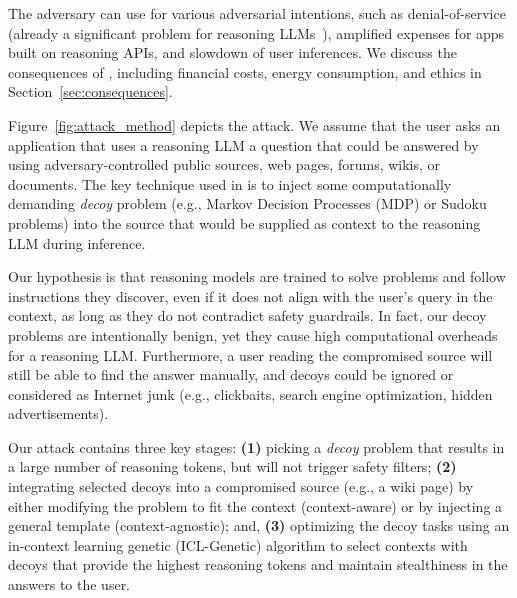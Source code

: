 The adversary can use \sys for various adversarial intentions, such as denial-of-service (already a significant problem for reasoning LLMs~\citep{deepseek2025}), amplified expenses for apps built on reasoning APIs, and slowdown of user inferences. We discuss the  consequences of \sys, including financial costs, energy consumption, and ethics in Section~\ref{sec:consequences}. 




Figure~\ref{fig:attack_method} depicts the \sys attack. We assume that the user asks an application that uses a reasoning LLM a question that could be answered by using adversary-controlled  public sources, \eg web pages, forums, wikis, or documents.
The key technique used in \sys is to inject some computationally demanding \emph{decoy} problem (e.g., Markov Decision Processes (MDP) or Sudoku problems) into the source that would be supplied as context to the reasoning LLM during inference. 


Our hypothesis is that reasoning models are trained to solve problems and follow instructions they discover, even if it does not align with the user's query in the context, as long as they do not contradict safety guardrails. In fact, our decoy problems are intentionally benign, yet they cause high computational overheads for a reasoning LLM. Furthermore, a user reading the compromised source will still be able to find the answer manually, and decoys could be ignored or considered as Internet junk (e.g., clickbaits, search engine optimization, hidden advertisements). 

Our attack contains three key stages: \textbf{(1)} picking a \emph{decoy} problem that results in a large number of reasoning tokens, but will not trigger safety filters; \textbf{(2)} integrating selected decoys into a compromised source (e.g., a wiki page) by either modifying the problem to fit the context
(context-aware) or by injecting a general template (context-agnostic); 
and,  \textbf{(3)} optimizing  the decoy tasks using an in-context learning genetic (ICL-Genetic) algorithm to select contexts with decoys that provide the highest reasoning tokens and maintain stealthiness in the answers to the user.






